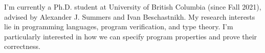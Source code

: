 \documentclass[12pt,letterpaper]{report}
\newcommand{\listitemspace}{0.15em}
\renewenvironment{itemize}
{\begin{list}{}{\setlength{\leftmargin}{0em}
			\setlength{\parskip}{0em}
			\setlength{\itemsep}{\listitemspace}
			\setlength{\parsep}{\listitemspace}}}
	{\end{list}}
\begin{document}
\begin{itemize}



	\item I’m currently a Ph.D. student at University of British Columbia (since Fall 2021), advised by Alexander
	      J. Summers and Ivan Beschastnikh. My research interests lie in programming languages, program
	      verification, and type theory. I’m particularly interested in how we can specify program properties and prove their correctness.

\end{itemize}

\end{document}
